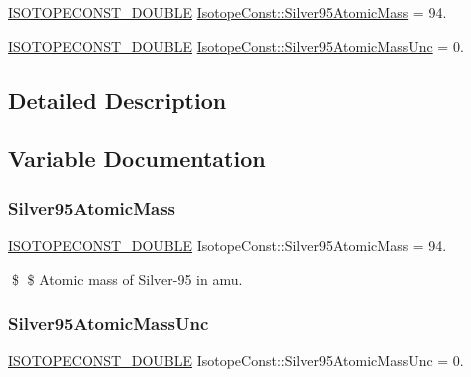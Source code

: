 \begin{DoxyCompactItemize}
\item 
\mbox{\hyperlink{group___isotope_const-_macros_ga8f45a7272ce02c0b4c65c44636ed719a}{I\+S\+O\+T\+O\+P\+E\+C\+O\+N\+S\+T\+\_\+\+D\+O\+U\+B\+LE}} \mbox{\hyperlink{group___isotope_const-_silver-_ag95_gaf9c95cccc044e98a240eb8bba51d1305}{Isotope\+Const\+::\+Silver95\+Atomic\+Mass}} = 94.
\item 
\mbox{\hyperlink{group___isotope_const-_macros_ga8f45a7272ce02c0b4c65c44636ed719a}{I\+S\+O\+T\+O\+P\+E\+C\+O\+N\+S\+T\+\_\+\+D\+O\+U\+B\+LE}} \mbox{\hyperlink{group___isotope_const-_silver-_ag95_ga76b317e0ba7e89b820c239fface85a7c}{Isotope\+Const\+::\+Silver95\+Atomic\+Mass\+Unc}} = 0.
\end{DoxyCompactItemize}


\subsection{Detailed Description}


\subsection{Variable Documentation}
\mbox{\label{group___isotope_const-_silver-_ag95_gaf9c95cccc044e98a240eb8bba51d1305}} 
\subsubsection{\texorpdfstring{Silver95\+Atomic\+Mass}{Silver95AtomicMass}}
{\footnotesize\ttfamily \mbox{\hyperlink{group___isotope_const-_macros_ga8f45a7272ce02c0b4c65c44636ed719a}{I\+S\+O\+T\+O\+P\+E\+C\+O\+N\+S\+T\+\_\+\+D\+O\+U\+B\+LE}} Isotope\+Const\+::\+Silver95\+Atomic\+Mass = 94.}

\$ \$ Atomic mass of Silver-\/95 in amu. \mbox{\label{group___isotope_const-_silver-_ag95_ga76b317e0ba7e89b820c239fface85a7c}} 
\subsubsection{\texorpdfstring{Silver95\+Atomic\+Mass\+Unc}{Silver95AtomicMassUnc}}
{\footnotesize\ttfamily \mbox{\hyperlink{group___isotope_const-_macros_ga8f45a7272ce02c0b4c65c44636ed719a}{I\+S\+O\+T\+O\+P\+E\+C\+O\+N\+S\+T\+\_\+\+D\+O\+U\+B\+LE}} Isotope\+Const\+::\+Silver95\+Atomic\+Mass\+Unc = 0.}


